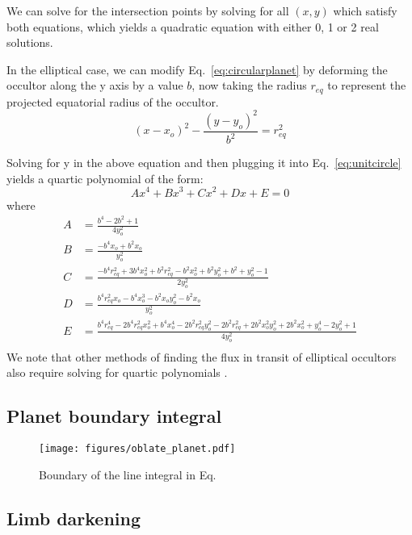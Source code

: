 \documentclass[twocolumn]{aastex631}
\begin{document}
We can solve for the intersection points by solving for all $(x,y)$ which satisfy both equations, which yields a quadratic equation with either 0, 1 or 2 real solutions.

In the elliptical case, we can modify Eq.~\ref{eq:circularplanet} by deforming the occultor along the y axis by a value $b$, now taking the radius $r_{eq}$ to represent the projected equatorial radius of the occultor. 
\begin{equation} \label{eq:ellipticalplanet}
(x-x_{o})^2-\frac{(y-y_o)^2}{b^2} = r_{eq}^2
\end{equation}

Solving for y in the above equation and then plugging it into Eq.~\ref{eq:unitcircle} yields a quartic polynomial of the form: 
\begin{equation} \label{eq:quarticform}
Ax^4 + Bx^3 + Cx^2 + Dx + E = 0
\end{equation} 
where
\begin{align*}
A &= \frac{b^4 - 2b^2 + 1}{4y_o^2}\\
B &= \frac{-b^4x_o + b^2x_o}{y_o^2}\\
C &= \frac{-b^4r_{eq}^2 + 3b^4x_o^2 + b^2r_{eq}^2 - b^2x_o^2 + b^2y_o^2 + b^2 + y_o^2 - 1}{2y_o^2} \\
D &= \frac{b^4r_{eq}^2x_o - b^4x_o^3 - b^2x_oy_o^2 - b^2x_o}{y_o^2} \\
E &= \frac{b^4r_{eq}^4 - 2b^4r_{eq}^2x_o^2 + b^4x_o^4 - 2b^2r_{eq}^2y_o^2 - 2b^2r_{eq}^2 + 2b^2x_o^2y_o^2 + 2b^2x_o^2 + y_o^4 - 2y_o^2 + 1}{4y_o^2}\\
\end{align*}
We note that other methods of finding the flux in transit of elliptical occultors also require solving for quartic polynomials \citep{rein2023}. 
\subsection{Planet boundary integral}

\begin{figure}[ht!]
    \begin{centering}
        \texttt{[image: figures/oblate\_planet.pdf]}
        \caption{Boundary of the line integral in Eq.~
        }
        \label{fig:integral_bounds}
    \end{centering}
\end{figure}

\subsection{Limb darkening}
\end{document}
